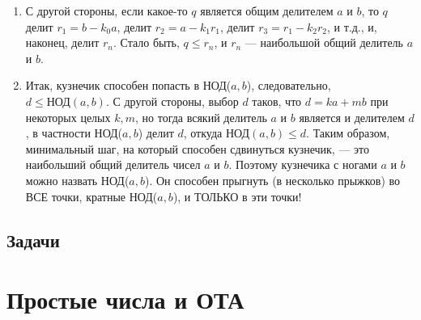 \begin{enumerate}
\item С другой стороны, если какое-то $q$ является общим делителем $a$ и $b$, то $q$ делит $r_1=b-k_0a$, делит $r_2=a-k_1r_1$, делит $r_3=r_1-k_2r_2$, и т.д., и, наконец, делит $r_n$. Стало быть, $q\le r_n$, и $r_n$ --- наибольшой общий делитель $a$ и $b$.
\item Итак, кузнечик способен попасть в НОД($a,b$), следовательно, $d\le\mbox{НОД}(a,b)$. С другой стороны, выбор $d$ таков, что $d=ka+mb$ при некоторых целых $k,m$, но тогда всякий делитель $a$ и $b$ является и делителем $d$, в частности НОД($a,b$) делит $d$, откуда $\mbox{НОД}(a,b)\le d$. Таким образом, минимальный шаг, на который способен сдвинуться кузнечик, --- это наибольший общий делитель чисел $a$ и $b$. Поэтому кузнечика с ногами $a$ и $b$ можно назвать НОД($a,b$). Он способен прыгнуть (в несколько прыжков) во ВСЕ точки, кратные НОД($a,b$), и ТОЛЬКО в эти точки!
\end{enumerate}
\subsection{Задачи}



\section{Простые числа и ОТА}

